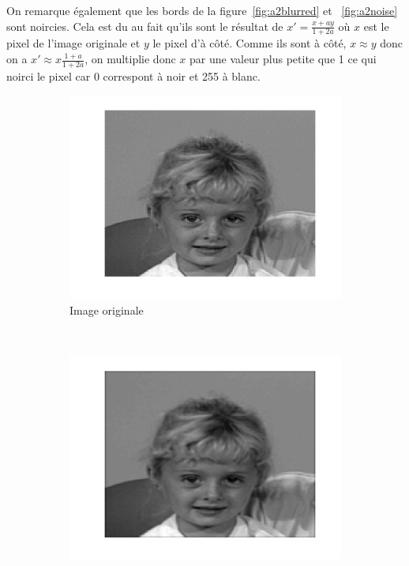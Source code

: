 On remarque également que les bords de la figure~\ref{fig:a2blurred} et ~\ref{fig:a2noise}
sont noircies.
Cela est du au fait qu'ils sont le résultat de $x' = \frac{x + ay}{1 + 2a}$ où $x$ est le pixel de l'image originale et $y$ le pixel d'à côté.
Comme ils sont à côté, $x \approx y$ donc on a $x' \approx x \frac{1+a}{1+2a}$, on multiplie donc $x$ par une valeur plus petite que 1 ce qui noirci le pixel
car $0$ correspont à noir et 255 à blanc.
\begin{figure}
  \centering
  \begin{subfigure}[b]{0.45\textwidth}
    \includegraphics[width=\textwidth]{Q2/original_20.png}
    \caption{Image originale}
    \label{fig:a2original}
  \end{subfigure}%
  ~ %
  \begin{subfigure}[b]{0.45\textwidth}
    \includegraphics[width=\textwidth]{Q2/blurred_20.png}

\end{subfigure}
\end{figure}
